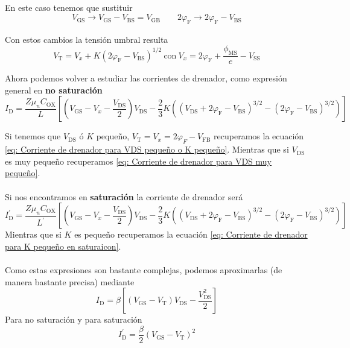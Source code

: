 En este caso tenemos que sustituir $$
V_\mathrm{GS} \xrightarrow[]{} V_\mathrm{GS}-V_\mathrm{BS}=V_\mathrm{GB} \quad  \quad  2\varphi_\mathrm{F} \xrightarrow[]{} 2\varphi_\mathrm{F}-V_\mathrm{BS}$$

Con estos cambios la tensión umbral resulta
\begin{equation}
    V_\mathrm{T}=V_x+K(2\varphi_\mathrm{F}-V_\mathrm{BS})^{1/2} \ \text{con} \ V_x=2\varphi_\mathrm{F}+\frac{\phi_\mathrm{MS}}{e}-V_\mathrm{SS}
\end{equation}

Ahora podemos volver a estudiar las corrientes de drenador, como expresión general en \textbf{no saturación}
\begin{equation}
    I_\mathrm{D}=\frac{Z \mu_n  C_\mathrm{OX}}{L} \left [ \left( V_\mathrm{GS}-V_x -\frac{V_\mathrm{DS}}{2}\right)V_\mathrm{DS}-\frac{2}{3}K\left( (V_\mathrm{DS}+2\varphi_\mathrm{F}-V_\mathrm{BS})^{3/2}- (2\varphi_\mathrm{F}-V_\mathrm{BS})^{3/2} \right ) \right ]
    \label{eq: Corriente de drenador en no saturacion general real}
\end{equation}

Si tenemos que $V_\mathrm{DS}$ ó $K$ pequeño, $V_\mathrm{T}=V_x=2\varphi_F-V_\mathrm{FB}$ recuperamos la ecuación \ref{eq: Corriente de drenador para VDS pequeño o K pequeño}. Mientras que si $V_\mathrm{DS}$ es muy pequeño recuperamos \ref{eq: Corriente de drenador para VDS muy pequeño}.\\\\
Si nos encontramos en \textbf{saturación} la corriente de drenador será 
\begin{equation}
    I^{'}_\mathrm{D}=\frac{Z \mu_n  C_\mathrm{OX}}{L^{'}} \left [ \left( V_\mathrm{GS}-V_x -\frac{V_\mathrm{DS}}{2}\right)V_\mathrm{DS}-\frac{2}{3}K\left( (V_\mathrm{DS}+2\varphi_\mathrm{F}-V_\mathrm{BS})^{3/2}- (2\varphi_\mathrm{F}-V_\mathrm{BS})^{3/2} \right ) \right ]
    \label{eq: Corriente de drenador en no saturacion general real}
\end{equation}
Mientras que si $K$ es pequeño recuperamos la ecuación \ref{eq: Corriente de drenador para K pequeño en saturaicon}.\\\\
Como estas expresiones son bastante complejas, podemos aproximarlas (de manera bastante precisa) mediante
\begin{equation}
    I_\mathrm{D}=\beta \left [(V_\mathrm{GS}-V_\mathrm{T})V_\mathrm{DS}-\frac{V^2_\mathrm{DS}}{2} \right ]
    \label{eq: corriete de drenador con ganancia}
\end{equation}
Para no saturación y para saturación
\begin{equation}
    I^{'}_\mathrm{D}=\frac{\beta}{2}(V_\mathrm{GS}-V_\mathrm{T})^2
\end{equation}

